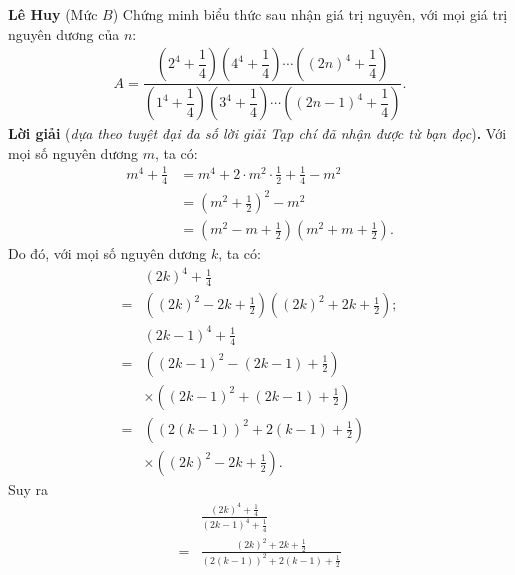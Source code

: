 \begin{multicols}{2}
	\vskip 0.05cm
	\hfill	\textbf{\color{thachthuctoanhoc}Lê Huy}
	\vskip 0.05cm
	{}
	(Mức $B$) Chứng minh biểu thức sau nhận giá trị nguyên, với mọi giá trị nguyên dương của $n$:
	\begin{align*}
		A\!=\!\dfrac{\left(2^4\!+\!\dfrac14\right)\!\left(4^4\!+\!\dfrac14\right)\!\cdots\! \left((2n)^4\!+\!\dfrac14\right)}{\left(1^4\!+\!\dfrac14\right)\left(3^4\!+\!\dfrac14\right)\!\cdots\! \left((2n\!-\!1)^4\!+\!\dfrac14\right)}.
	\end{align*}
	\textbf{\color{thachthuctoanhoc}Lời giải} (\textit{dựa theo tuyệt đại đa số lời giải Tạp chí đã nhận được từ bạn đọc})\textbf{\color{thachthuctoanhoc}.}
	\vskip 0.05cm
	Với mọi số nguyên dương $m$, ta có:
	\begin{align*}
		{m^4} + \frac{1}{4} &= {m^4} + 2 \cdot {m^2} \cdot \frac{1}{2} + \frac{1}{4} - {m^2}\\[-0.6ex]
		& = {\left( {{m^2} + \frac{1}{2}} \right)^2} - {m^2}\\[-0.6ex]
		 &= \left( {{m^2} - m + \frac{1}{2}} \right)\left( {{m^2} + m + \frac{1}{2}} \right).
	\end{align*}
	Do đó, với mọi số nguyên dương $k$, ta có:
	\begin{align*}
		&{\left( {2k} \right)^4} + \frac{1}{4} \\[-0.6ex]
		= &\left( {{{\left( {2k} \right)}^2} - 2k + \frac{1}{2}} \right)\left( {{{\left( {2k} \right)}^2} + 2k + \frac{1}{2}} \right);\\[-0.6ex]
			&{\left( {2k - 1} \right)^4} + \frac{1}{4} \\[-0.6ex]
			= &\left(\left( {2k - 1} \right)^2 - \left( {2k - 1} \right) + \frac{1}{2}\right)\\[-0.6ex]
			&\times\left( \left( {2k - 1} \right)^2 + \left( {2k - 1} \right) + \frac{1}{2} \right)\\[-0.6ex]
			 = &\left( \left( 2\left( {k - 1} \right) \right)^2 + 2\left(k - 1 \right) + \frac{1}{2}\right)\\[-0.6ex]
			 &\times\left(\left( {2k} \right)^2 - 2k + \frac{1}{2}\right).
	\end{align*}
	Suy ra
	\begin{align*}
		&\frac{{{{\left( {2k} \right)}^4} + \frac{1}{4}}}{{{{\left( {2k - 1} \right)}^4} + \frac{1}{4}}} \\[-0.6ex]
		= &\frac{{{{\left( {2k} \right)}^2} + 2k + \frac{1}{2}}}{{{{\left( {2\left( {k - 1} \right)} \right)}^2} + 2\left( {k - 1} \right) + \frac{1}{2}}}
	\end{align*}

\end{multicols}
